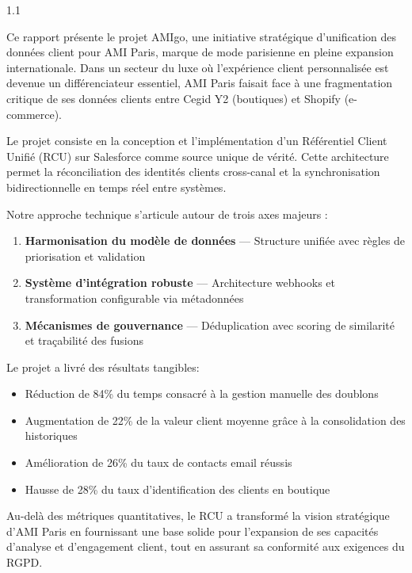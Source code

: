 \documentclass[12pt,a4paper,openany,oneside]{report}
\begin{document}
\begin{spacing}{1.1}
\normalsize

Ce rapport présente le projet AMIgo, une initiative stratégique d'unification des données client pour AMI Paris, marque de mode parisienne en pleine expansion internationale. Dans un secteur du luxe où l'expérience client personnalisée est devenue un différenciateur essentiel, AMI Paris faisait face à une fragmentation critique de ses données clients entre Cegid Y2 (boutiques) et Shopify (e-commerce).

Le projet consiste en la conception et l'implémentation d'un Référentiel Client Unifié (RCU) sur Salesforce comme source unique de vérité. Cette architecture permet la réconciliation des identités clients cross-canal et la synchronisation bidirectionnelle en temps réel entre systèmes.

Notre approche technique s'articule autour de trois axes majeurs :

\begin{enumerate}[itemsep=-2pt,topsep=0pt,parsep=0pt]
    \item \textbf{Harmonisation du modèle de données} — Structure unifiée avec règles de priorisation et validation
    \item \textbf{Système d'intégration robuste} — Architecture webhooks et transformation configurable via métadonnées
    \item \textbf{Mécanismes de gouvernance} — Déduplication avec scoring de similarité et traçabilité des fusions
\end{enumerate}

\vspace{-0.5em}
Le projet a livré des résultats tangibles:
\begin{itemize}[itemsep=-2pt,topsep=2pt,parsep=0pt,leftmargin=*]
  \item Réduction de 84\% du temps consacré à la gestion manuelle des doublons
  \item Augmentation de 22\% de la valeur client moyenne grâce à la consolidation des historiques
  \item Amélioration de 26\% du taux de contacts email réussis
  \item Hausse de 28\% du taux d'identification des clients en boutique
\end{itemize}

\vspace{-0.5em}
Au-delà des métriques quantitatives, le RCU a transformé la vision stratégique d'AMI Paris en fournissant une base solide pour l'expansion de ses capacités d'analyse et d'engagement client, tout en assurant sa conformité aux exigences du RGPD.

\end{spacing}
\end{document}
